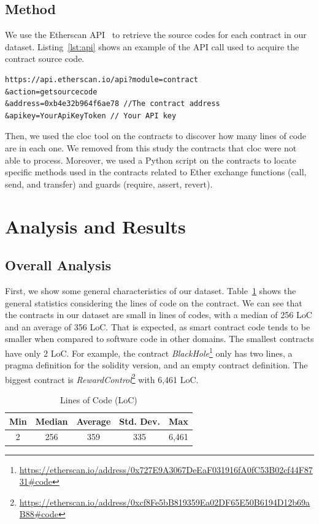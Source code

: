 \documentclass[10pt,conference]{IEEEtran}
\begin{document}
\subsection{Method}

We use the Etherscan API~\cite{etherscan_api} to retrieve the source codes for each contract in our dataset. Listing~\ref{lst:api} shows an example of the API call used to acquire the contract source code.
\begin{lstlisting}[language=solidity, caption=Etherscan API call, label={lst:api}]
https://api.etherscan.io/api?module=contract
&action=getsourcecode
&address=0xb4e32b964f6ae78 //The contract address
&apikey=YourApiKeyToken // Your API key
\end{lstlisting}

Then, we used the cloc tool on the contracts to discover how many lines of code are in each one. We removed from this study the contracts that cloc were not able to process. Moreover, we used a Python script on the contracts to locate specific methods used in the contracts related to Ether exchange functions (call, send, and transfer) and guards (require, assert, revert).

\section{Analysis and Results}

\subsection{Overall Analysis}

First, we show some general characteristics of our dataset.
Table~\ref{tab:loc} shows the general statistics considering the lines of code on the contract. We can see that the contracts in our dataset are small in lines of codes, with a median of 256 LoC and an average of 356 LoC. That is expected, as smart contract code tends to be smaller when compared to software code in other domains.  The smallest contracts have only 2 LoC.  For example, the contract \textit{BlackHole}\footnote{\url{https://etherscan.io/address/0x727E9A3067DeEaF031916fA0fC53B02cf44F8731\#code}} only has two lines, a pragma definition for the solidity version, and an empty contract definition. The biggest contract is \textit{RewardControl}\footnote{\url{https://etherscan.io/address/0xcf8Fe5bB819359Ea02DF65E50B6194D12b69aB88\#code}} with 6,461 LoC. 

\begin{table}
\center
  \caption{Lines of Code (LoC)}
  \label{tab:loc}
  \begin{tabular}{c c c c c}
    \hline
    Min & Median & Average & Std. Dev. & Max \\
    \hline
   2 & 256 & 359 & 335 & 6,461 \\
  \hline
\end{tabular}
\end{table}
\end{document}
